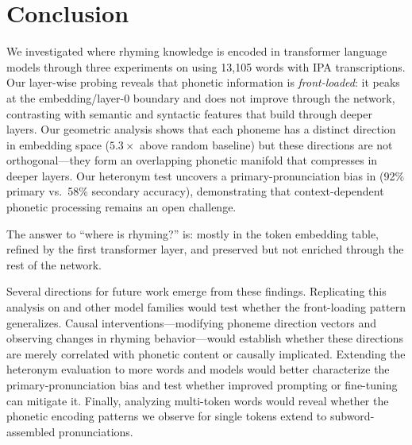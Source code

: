 \section{Conclusion}
\label{sec:conclusion}

We investigated where rhyming knowledge is encoded in transformer language models through three experiments on \gptmed using 13{,}105 words with IPA transcriptions.
Our layer-wise probing reveals that phonetic information is \emph{front-loaded}: it peaks at the embedding/layer-0 boundary and does not improve through the network, contrasting with semantic and syntactic features that build through deeper layers.
Our geometric analysis shows that each phoneme has a distinct direction in embedding space ($5.3\times$ above random baseline) but these directions are not orthogonal---they form an overlapping phonetic manifold that compresses in deeper layers.
Our heteronym test uncovers a primary-pronunciation bias in \gptfour (92\% primary vs.\ 58\% secondary accuracy), demonstrating that context-dependent phonetic processing remains an open challenge.

The answer to ``where is rhyming?'' is: mostly in the token embedding table, refined by the first transformer layer, and preserved but not enriched through the rest of the network.

Several directions for future work emerge from these findings.
Replicating this analysis on \llama and other model families would test whether the front-loading pattern generalizes.
Causal interventions---modifying phoneme direction vectors and observing changes in rhyming behavior---would establish whether these directions are merely correlated with phonetic content or causally implicated.
Extending the heteronym evaluation to more words and models would better characterize the primary-pronunciation bias and test whether improved prompting or fine-tuning can mitigate it.
Finally, analyzing multi-token words would reveal whether the phonetic encoding patterns we observe for single tokens extend to subword-assembled pronunciations.
